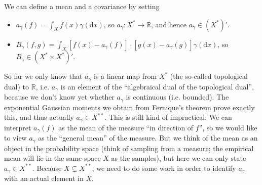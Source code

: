 \documentclass{scrartcl}
\theoremstyle{definition}
\theoremstyle{remark}
\newcommand{\de}{\mathrm d}
\newcommand{\R}{\mathbb R}
\begin{document}
We can define a mean and a covariance by setting
\begin{itemize}
\item $a_\gamma(f) = \int_X f(x)\gamma(\de x)$, so $a_\gamma: X^*\to \R$, and hence $a_\gamma \in (X^*)'$.
\item $B_\gamma(f, g) = \int_X [f(x) - a_\gamma(f)]\cdot [g(x)-a_\gamma(g)]\gamma(\de x)$, so $B_\gamma \in (X^*\times X^*)'$.
\end{itemize}
So far we only know that $a_\gamma$ is a linear map from $X^*$ (the so-called topological dual) to $\R$, i.e. $a_\gamma$ is an element of the ``algebraical dual of the topological dual'', because we don't know yet whether $a_\gamma$ is continuous (i.e. bounded). The exponential Gaussian moments we obtain from Fernique's theorem prove exactly this, and thus actually $a_\gamma \in X^{**}$. This is still kind of impractical: We can interpret $a_\gamma(f)$ as the mean of the measure ``in direction of $f$'', so we would like to view $a_\gamma$ as the ``general mean'' of the measure. But we think of the mean as an object in the probability space (think of sampling from a measure; the empirical mean will lie in the same space $X$ as the samples), but here we can only state $a_\gamma \in X^{**}$. Because $X \subsetneq X^{**}$, we need to do some work in order to identify $a_\gamma$ with an actual element in $X$. 
\end{document}
